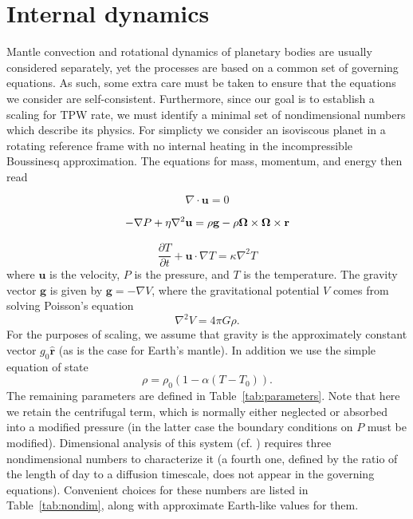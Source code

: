 \documentclass[extra,mreferee]{gji}
\begin{document}
\section{Internal dynamics}
\label{sec:internal}

Mantle convection and rotational dynamics of planetary bodies are usually considered separately, yet the processes are based on a common set of governing equations. 
As such, some extra care must be taken to ensure that the equations we consider are self-consistent. 
Furthermore, since our goal is to establish a scaling for TPW rate, we must identify a minimal set of nondimensional numbers which describe its physics.
For simplicty we consider an isoviscous planet in a rotating reference frame with no internal heating in the incompressible Boussinesq approximation.  The equations for mass, momentum, and energy then read

\begin{equation}
\nabla \cdot \mathbf{u} = 0
\label{eq:conserve_mass}
\end{equation}

\begin{equation}
\begin{aligned}
- \nabla P + \eta \nabla^2 \mathbf{u} =  \rho \mathbf{g} -  \rho \mitbf{\Omega} \times \mitbf{\Omega} \times \mathbf{r}
\label{eq:navier_stokes}
\end{aligned}
\end{equation}

\begin{equation}
\frac{\partial T}{\partial t} + \mathbf{u} \cdot \nabla T = \kappa \nabla^2 T
\label{eq:energy}
\end{equation}
where $\mathbf{u}$ is the velocity, $P$ is the pressure, and $T$ is the temperature.
The gravity vector $\mathbf{g}$ is given by $\mathbf{g} = -\nabla V$, where the 
gravitational potential $V$ comes from solving Poisson's equation
\begin{equation}
\nabla^2 V = 4 \pi G \rho.
\end{equation}
For the purposes of scaling, we assume that gravity is the approximately constant
vector $g_0 \mathbf{\hat{r}}$ (as is the case for Earth's mantle).
In addition we use the simple equation of state
\begin{equation}
\rho = \rho_0 \left( 1 - \alpha (T-T_0) \right).
\label{eq:eos}
\end{equation}
The remaining parameters are defined in Table~\ref{tab:parameters}.
Note that here we retain the centrifugal term, which is normally either neglected or absorbed into a modified pressure
(in the latter case the boundary conditions on $P$ must be modified).
Dimensional analysis of this system (cf. \citet{barenblatt1996scaling}) requires three nondimensional numbers to characterize it
(a fourth one, defined by the ratio of the length of day to a diffusion timescale, does not appear in the governing equations).
Convenient choices for these numbers are listed in Table~\ref{tab:nondim}, along with approximate Earth-like values for them.
\end{document}
